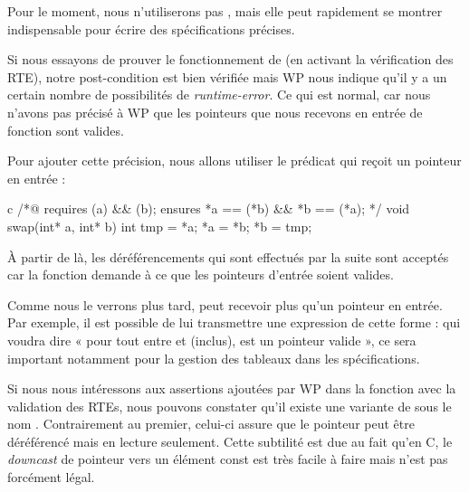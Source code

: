 \documentclass[middle]{zmdocument}
\begin{document}
Pour le moment, nous n'utiliserons pas , mais elle peut rapidement se
montrer indispensable pour écrire des spécifications précises.





Si nous essayons de prouver le fonctionnement de  (en activant
la vérification des RTE), notre post-condition est bien vérifiée mais WP nous 
indique qu'il y a un certain nombre de possibilités de \textit{runtime-error}. Ce qui 
est normal, car nous n'avons pas précisé à WP que les pointeurs que nous
recevons en entrée de fonction sont valides.



Pour ajouter cette précision, nous allons utiliser le prédicat  qui
reçoit un pointeur en entrée :



\begin{CodeBlock}{c}
/*@
  requires \valid(a) && \valid(b);
  ensures  *a == \old(*b) && *b == \old(*a);
*/
void swap(int* a, int* b){
  int tmp = *a;
  *a = *b;
  *b = tmp;
}
\end{CodeBlock}



À partir de là, les déréférencements qui sont effectués par la suite sont 
acceptés car la fonction demande à ce que les pointeurs d'entrée soient 
valides.



Comme nous le verrons plus tard,  peut recevoir plus qu'un 
pointeur en entrée. Par exemple, il est possible de lui transmettre une 
expression de cette forme :  qui voudra dire « pour
tout  entre  et  (inclus),  est un pointeur valide », ce sera important 
notamment pour la gestion des tableaux dans les spécifications.



Si nous nous intéressons aux assertions ajoutées par WP dans la fonction 
avec la validation des RTEs, nous pouvons constater qu'il existe une variante
de  sous le nom . Contrairement au premier, 
celui-ci assure que le pointeur peut être déréférencé mais en lecture 
seulement. Cette subtilité est due au fait qu'en C, le \textit{downcast} de pointeur 
vers un élément const est très facile à faire mais n'est pas forcément légal.
\end{document}
